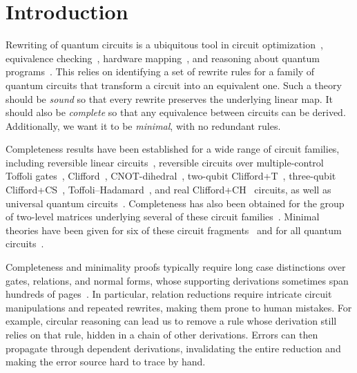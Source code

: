 \documentclass[acmsmall,nonacm,11pt,screen]{acmart}
\begin{document}
\section{Introduction}
Rewriting of quantum circuits is a ubiquitous tool in circuit optimization~\cite{hietala2021voqc,nam2018automated,maslov2008simplification,xu2022quartz}, equivalence checking~\cite{yamashita2010fast}, hardware mapping~\cite{sivarajah2020tket}, and reasoning about quantum programs~\cite{fang2026hadamard}. This relies on identifying a set of rewrite rules for a family of quantum circuits that transform a circuit into an equivalent one.
Such a theory should be \emph{sound} so that every rewrite preserves the underlying linear map. It should also be \emph{complete} so that any equivalence between circuits can be derived. Additionally, we want it to be \emph{minimal}, with no redundant rules. 

Completeness results have been established for a wide range of circuit families, including reversible linear circuits~\cite{lafont2003boolean,sakashita2013cnot}, reversible circuits over multiple-control Toffoli gates~\cite{feng2026complete,feng2026ancillas}, Clifford~\cite{selinger2015clifford,makary2021real,li2025qutrit,bian2026qupit}, CNOT-dihedral~\cite{amy2018cnotdihedral,blake2026phaseaffine}, two-qubit Clifford+T~\cite{bian2023cliffordt2}, three-qubit Clifford+CS~\cite{bian2023cliffordcs3}, Toffoli--Hadamard~\cite{amy2024toffoli}, and real Clifford+CH~\cite{clement2026realcliffordch} circuits, as well as universal quantum circuits~\cite{clement2023complete,clement2024extensions}. Completeness has also been obtained for the group of two-level matrices underlying several of these circuit families~\cite{greylyn2014,bian2021un,li2021on,fang2026hadamard,clement2019thesis}. Minimal theories have been given for six of these circuit fragments~\cite{blake2026simpler} and for all quantum circuits~\cite{clement2024minimal}.

Completeness and minimality proofs typically require long case distinctions over gates, relations, and normal forms, whose supporting derivations sometimes span hundreds of pages~\cite{fang2026hadamard,li2025qutrit,clement2026realcliffordch}. In particular, relation reductions require intricate circuit manipulations and repeated rewrites, making them prone to human mistakes. For example, circular reasoning can lead us to remove a rule whose derivation still relies on that rule, hidden in a chain of other derivations. Errors can then propagate through dependent derivations, invalidating the entire reduction and making the error source hard to trace by hand. 
\end{document}
